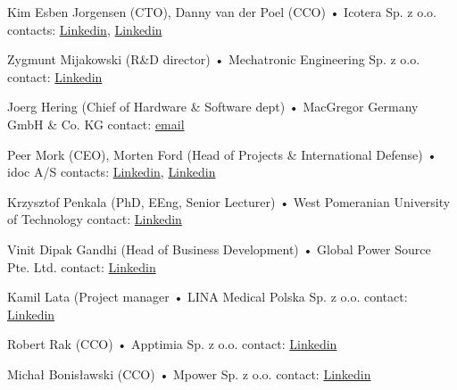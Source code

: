 \documentclass{tccv}
\begin{document}
\begin{yearlist}

\item[Kim Esben Jorgensen (CTO), Danny van der Poel (CCO)]{•}
     {Icotera Sp. z o.o.}
     {contacts: \href{https://www.linkedin.com/in/kim-esben-j\%C3\%B8rgensen-8685229/}{Linkedin}, \href{https://www.linkedin.com/in/dannyvanderpoel/}{Linkedin}}

\item[Zygmunt Mijakowski (R\&D director)]{•}
     {Mechatronic Engineering Sp. z o.o.}
     {contact: \href{https://www.linkedin.com/in/zmijakowski/}{Linkedin}}
     
\item[Joerg Hering (Chief of Hardware \& Software dept)]{•}
     {MacGregor Germany GmbH \& Co. KG}
     {contact: \href{mailto:jhe@danelec.com}{email}}
     
\item[Peer Mork (CEO), Morten Ford (Head of Projects \& International Defense)]{•}
     {idoc A/S}
     {contacts: \href{https://www.linkedin.com/in/peermork}{Linkedin}, \href{https://www.linkedin.com/in/morten-ford-08368264}{Linkedin}}
     
\item[Krzysztof Penkala (PhD, EEng, Senior Lecturer)]{•}
     {West Pomeranian University of Technology}
     {contact: \href{https://www.linkedin.com/in/krzysztof-penkala-4a498a26/}{Linkedin}}
     
\item[Vinit Dipak Gandhi (Head of Business Development)]{•}
     {Global Power Source Pte. Ltd. }
     {contact: \href{https://www.linkedin.com/in/vinit-dipak-gandhi-71782612}{Linkedin}}
     
\item[Kamil Lata (Project manager]{•}
     {LINA Medical Polska Sp. z o.o.}
     {contact: \href{https://www.linkedin.com/in/kamil-lata-a71a41138}{Linkedin}}
     
\item[Robert Rak (CCO)]{•}
     {Apptimia Sp. z o.o.}
     {contact: \href{https://www.linkedin.com/in/robert-rak-4018a64a}{Linkedin}}

\item[Michał Bonisławski (CCO)]{•}
     {Mpower Sp. z o.o.}
     {contact: \href{https://www.linkedin.com/in/micha\%C5\%82-bonis\%C5\%82awski-322bb91aa}{Linkedin}}

\end{yearlist}

\clearpage
\end{document}
